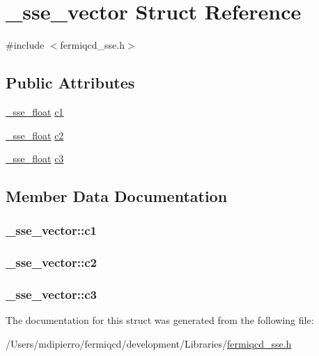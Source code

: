 \hypertarget{struct__sse__vector}{
\section{\_\-sse\_\-vector Struct Reference}
\label{struct__sse__vector}
}


{\ttfamily \#include $<$fermiqcd\_\-sse.h$>$}\subsection*{Public Attributes}
\begin{DoxyCompactItemize}
\item 
\hyperlink{struct__sse__float}{\_\-sse\_\-float} \hyperlink{struct__sse__vector_aa29a87555e3a0b9b0ad9cb618e88582c}{c1}
\item 
\hyperlink{struct__sse__float}{\_\-sse\_\-float} \hyperlink{struct__sse__vector_a02a7988ba95b67d7353170c74bc77c98}{c2}
\item 
\hyperlink{struct__sse__float}{\_\-sse\_\-float} \hyperlink{struct__sse__vector_a89243b2d838a0dae3474a3899c925749}{c3}
\end{DoxyCompactItemize}


\subsection{Member Data Documentation}
\hypertarget{struct__sse__vector_aa29a87555e3a0b9b0ad9cb618e88582c}{
\subsubsection[{c1}]{ {\bf \_\-sse\_\-vector::c1}}}
\label{struct__sse__vector_aa29a87555e3a0b9b0ad9cb618e88582c}
\hypertarget{struct__sse__vector_a02a7988ba95b67d7353170c74bc77c98}{
\subsubsection[{c2}]{ {\bf \_\-sse\_\-vector::c2}}}
\label{struct__sse__vector_a02a7988ba95b67d7353170c74bc77c98}
\hypertarget{struct__sse__vector_a89243b2d838a0dae3474a3899c925749}{
\subsubsection[{c3}]{ {\bf \_\-sse\_\-vector::c3}}}
\label{struct__sse__vector_a89243b2d838a0dae3474a3899c925749}


The documentation for this struct was generated from the following file:\begin{DoxyCompactItemize}
\item 
/Users/mdipierro/fermiqcd/development/Libraries/\hyperlink{fermiqcd__sse_8h}{fermiqcd\_\-sse.h}\end{DoxyCompactItemize}
